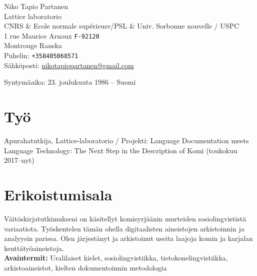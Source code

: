 \documentclass[11pt, a4paper]{article}
\begin{document}

{\LARGE Niko Tapio Partanen}\\[1cm] %
Lattice laboratorio\\
CNRS \& Ecole normale supérieure/PSL \& Univ. Sorbonne nouvelle / USPC\\
1 rue Maurice Arnoux \texttt{F-92120}\\
Montrouge Ranska\\[.2cm]
Puhelin: \texttt{+358405068571}\\ %
Sähköposti: \href{mailto:nikotapiopartanen@gmail.com}{nikotapiopartanen@gmail.com}\\ %

\vfill %


Syntymäaika: 23. joulukuuta 1986 – Suomi\\ %


\section*{Työ}

Apurahatutkija, Lattice-laboratorio / Projekti: Language Documentation meets Language Technology: The Next Step in the Description of Komi (toukokuu 2017–nyt)%

\section*{Erikoistumisala}

Väitöskirjatutkimukseni on käsitellyt komisyrjäänin murteiden sosiolingvististä variaatiota. Työskentelen tämän ohella digitaalisten aineistojen arkistoinnin ja analyysin parissa. Olen järjestänyt ja arkistoinut useita laajoja komin ja karjalan kenttätyöaineistoja.\\

\textbf{Avaintermit:} Uralilaiset kielet, sosiolingvistiikka, tietokonelingvistiikka, arkistoaineistot, kielten dokumentoinnin metodologia %
\end{document}
